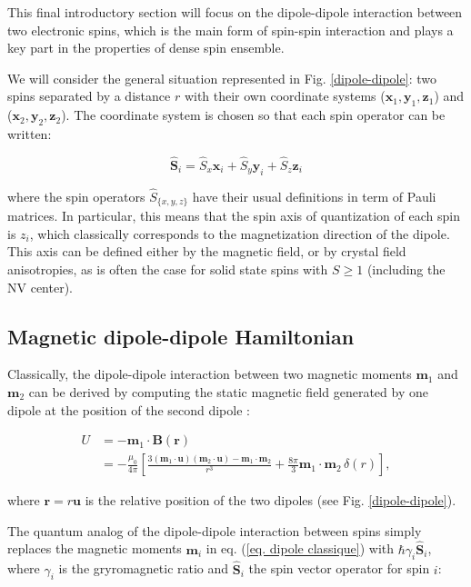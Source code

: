 \documentclass[a4paper, 11pt]{report}
\begin{document}
This final introductory section will focus on the dipole-dipole interaction between two electronic spins, which is the main form of spin-spin interaction and plays a key part in the properties of dense spin ensemble. 

We will consider the general situation represented in Fig. \ref{dipole-dipole}: two spins separated by a distance $r$ with their own coordinate systems ($\mathbf{x}_1,\mathbf{y}_1,\mathbf{z}_1$) and ($\mathbf{x}_2,\mathbf{y}_2,\mathbf{z}_2$). The coordinate system is chosen so that each spin operator can be written:

\begin{equation}
\hat{\mathbf{S}}_i=\hat{S}_x \mathbf{x}_i + \hat{S}_y \mathbf{y}_i + \hat{S}_z \mathbf{z}_i
\end{equation}

where the spin operators $\hat S_{\{x,y,z\} }$ have their usual definitions in term of Pauli matrices. In particular, this means that the spin axis of quantization of each spin is $z_i$, which classically corresponds to the magnetization direction of the dipole. This axis can be defined either by the magnetic field, or by crystal field anisotropies, as is often the case for solid state spins with $S\geq 1$ (including the NV center).

\subsection{Magnetic dipole-dipole Hamiltonian}

Classically, the dipole-dipole interaction between two magnetic moments $\mathbf{m}_1$ and $\mathbf{m}_2$ can be derived by computing the static magnetic field generated by one dipole at the position of the second dipole \cite[p.~188]{jackson1999classical}:

\begin{align}
U&=-\mathbf{m}_1 \cdot \mathbf{B}(\mathbf{r}) \nonumber \\
&=-\frac{\mu_0}{4 \pi}\left[ \frac{3 (\mathbf{m}_1\cdot\mathbf{u})(\mathbf{m}_2\cdot\mathbf{u}) - \mathbf{m}_1\cdot\mathbf{m}_2}{r^3}+\frac{8\pi}{3}\mathbf{m}_1\cdot\mathbf{m}_2\,\delta(r)\right], \label{eq. dipole classique}
\end{align}

where $\mathbf{r}=r \mathbf{u}$ is the relative position of the two dipoles (see Fig. \ref{dipole-dipole}). 

The quantum analog of the dipole-dipole interaction between spins simply replaces the magnetic moments $\mathbf{m}_i$ in eq. (\ref{eq. dipole classique}) with $\hbar \gamma_i \hat{\mathbf{S}}_i$, where $\gamma_i$ is the gryromagnetic ratio and $\hat{\mathbf{S}}_i$ the spin vector operator for spin $i$:
\end{document}
